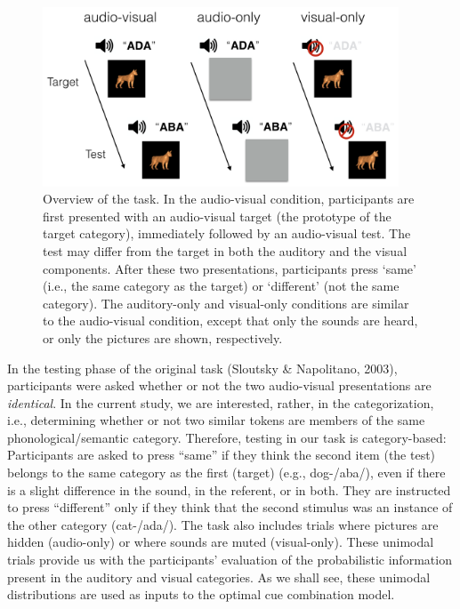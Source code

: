 \documentclass[english,floatsintext,man]{apa6}
\theoremstyle{definition}
\theoremstyle{definition}
\theoremstyle{definition}
\theoremstyle{remark}
\begin{document}
\begin{figure}

{\centering \includegraphics[width=400px]{pictures/task} 

}

\caption{Overview of the task. In the audio-visual condition, participants are first presented with an audio-visual target (the prototype of the target category), immediately followed by an audio-visual test. The test may differ from the target in both the auditory and the visual components. After these two presentations, participants press `same' (i.e., the same category as the target) or `different' (not the same category). The auditory-only and visual-only conditions are similar to the audio-visual condition, except that only the sounds are heard, or only the pictures are shown, respectively.}\label{fig:task}
\end{figure}

In the testing phase of the original task (Sloutsky \& Napolitano,
2003), participants were asked whether or not the two audio-visual
presentations are \emph{identical}. In the current study, we are
interested, rather, in the categorization, i.e., determining whether or
not two similar tokens are members of the same phonological/semantic
category. Therefore, testing in our task is category-based: Participants
are asked to press \enquote{same} if they think the second item (the
test) belongs to the same category as the first (target) (e.g.,
dog-/aba/), even if there is a slight difference in the sound, in the
referent, or in both. They are instructed to press \enquote{different}
only if they think that the second stimulus was an instance of the other
category (cat-/ada/). The task also includes trials where pictures are
hidden (audio-only) or where sounds are muted (visual-only). These
unimodal trials provide us with the participants' evaluation of the
probabilistic information present in the auditory and visual categories.
As we shall see, these unimodal distributions are used as inputs to the
optimal cue combination model.
\end{document}
